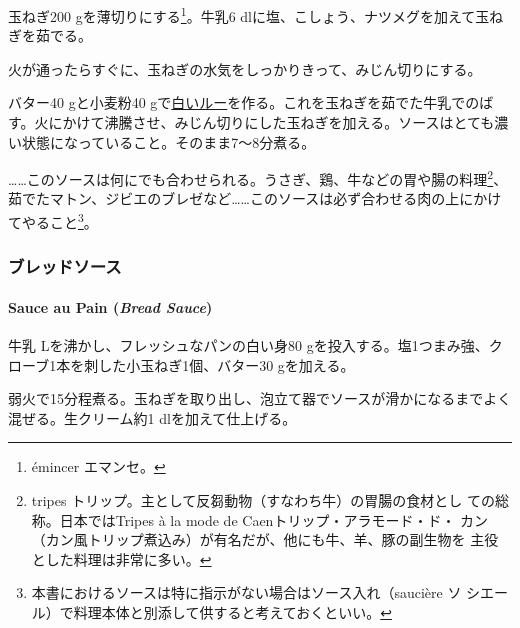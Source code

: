 \begin{recette}
玉ねぎ200 gを薄切りにする\footnote{émincer エマンセ。}。牛乳6
dlに塩、こしょう、ナツメグを加えて玉ねぎを茹でる。

火が通ったらすぐに、玉ねぎの水気をしっかりきって、みじん切りにする。

バター40 gと小麦粉40
gで\protect\hyperlink{roux-blanc}{白いルー}を作る。これを玉ねぎを茹でた牛乳でのばす。火にかけて沸騰させ、みじん切りにした玉ねぎを加える。ソースはとても濃い状態になっていること。そのまま7〜8分煮る。

\ldots{}\ldots{}このソースは何にでも合わせられる。うさぎ、鶏、牛などの胃や腸の料理\footnote{tripes
  トリップ。主として反芻動物（すなわち牛）の胃腸の食材とし
  ての総称。日本ではTripes à la mode de Caenトリップ・アラモード・ド・
  カン（カン風トリップ煮込み）が有名だが、他にも牛、羊、豚の副生物を
  主役とした料理は非常に多い。}、茹でたマトン、ジビエのブレゼなど\ldots{}\ldots{}このソースは必ず合わせる肉の上にかけてやること\footnote{本書におけるソースは特に指示がない場合はソース入れ（saucière
  ソ シエール）で料理本体と別添して供すると考えておくといい。}。

\maeaki

\hypertarget{ux30d6ux30ecux30c3ux30c9ux30bdux30fcux30b9}{%
\subsubsection{ブレッドソース}\label{ux30d6ux30ecux30c3ux30c9ux30bdux30fcux30b9}}

\hypertarget{bread-sauce}{%
\paragraph{\texorpdfstring{Sauce au Pain (\emph{Bread
Sauce})}{Sauce au Pain (Bread Sauce)}}\label{bread-sauce}}


牛乳\undemi{} Lを沸かし、フレッシュなパンの白い身80
gを投入する。塩1つまみ強、クローブ1本を刺した小玉ねぎ1個、バター30
gを加える。

弱火で15分程煮る。玉ねぎを取り出し、泡立て器でソースが滑かになるまでよく混ぜる。生クリーム約1
dlを加えて仕上げる。


\end{recette}
